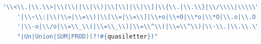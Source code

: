 \begin{lstlisting}[language=coffee]
    '\\<\\.|\\.\\>|\\(\\||\\|\\)|\\[\\||\\|\\]|\\{\\.|\\.\\}|\\/\\\\|\\\\\\/' +
    '|\\~\\:|\\(\\=|\\=\\)|\\[\\=|\\=\\]|\\+o|\\+O|\\*o|\\*O|\\.o|\\.O' +
    '|\\-o|\\/o|\\=\\_\\(|\\=\\_\\)|\\=\\^\\(|\\=\\^\\)|\\-\\.|\\.\\.\\.|(?:Int|Inter' +
    "|Un|Union|SUM|PROD)(?!#{quasiletter})"
\end{lstlisting}

